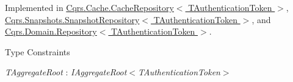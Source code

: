 Implemented in \hyperlink{classCqrs_1_1Cache_1_1CacheRepository_a1c4bbe08b2a21523a4871d9a2f484ee6}{Cqrs.\+Cache.\+Cache\+Repository$<$ T\+Authentication\+Token $>$}, \hyperlink{classCqrs_1_1Snapshots_1_1SnapshotRepository_a4a7484e7754cae876f0c04e640eb80ff}{Cqrs.\+Snapshots.\+Snapshot\+Repository$<$ T\+Authentication\+Token $>$}, and \hyperlink{classCqrs_1_1Domain_1_1Repository_a7795a0bd435022c686306fbc76311694}{Cqrs.\+Domain.\+Repository$<$ T\+Authentication\+Token $>$}.

\begin{Desc}
\item[Type Constraints]\begin{description}
\item[{\em T\+Aggregate\+Root} : {\em I\+Aggregate\+Root$<$T\+Authentication\+Token$>$}]\end{description}
\end{Desc}
